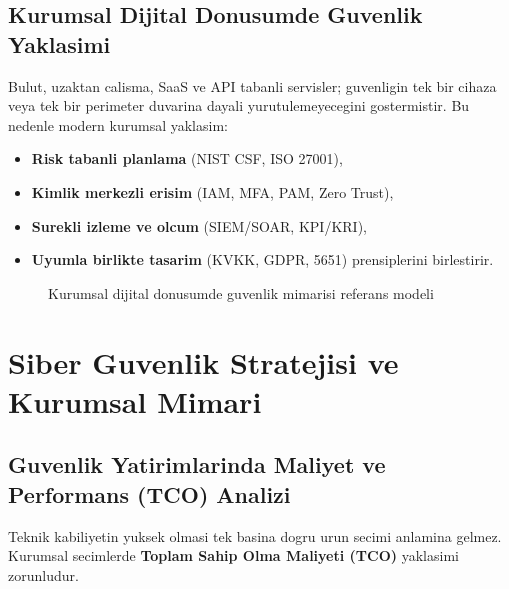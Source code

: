 \subsection{Kurumsal Dijital Donusumde Guvenlik Yaklasimi}
Bulut, uzaktan calisma, SaaS ve API tabanli servisler; guvenligin tek bir cihaza veya tek bir perimeter
duvarina dayali yurutulemeyecegini gostermistir. Bu nedenle modern kurumsal yaklasim:

\begin{itemize}
    \item \textbf{Risk tabanli planlama} (NIST CSF, ISO 27001),
    \item \textbf{Kimlik merkezli erisim} (IAM, MFA, PAM, Zero Trust),
    \item \textbf{Surekli izleme ve olcum} (SIEM/SOAR, KPI/KRI),
    \item \textbf{Uyumla birlikte tasarim} (KVKK, GDPR, 5651) prensiplerini birlestirir.
\end{itemize}

\begin{figure}[htbp]
    \centering
    \caption{Kurumsal dijital donusumde guvenlik mimarisi referans modeli}
    \label{fig:ch1-digital-security-architecture}
\end{figure}

\section{Siber Guvenlik Stratejisi ve Kurumsal Mimari}

\subsection{Guvenlik Yatirimlarinda Maliyet ve Performans (TCO) Analizi}
Teknik kabiliyetin yuksek olmasi tek basina dogru urun secimi anlamina gelmez. Kurumsal secimlerde
\textbf{Toplam Sahip Olma Maliyeti (TCO)} yaklasimi zorunludur.

